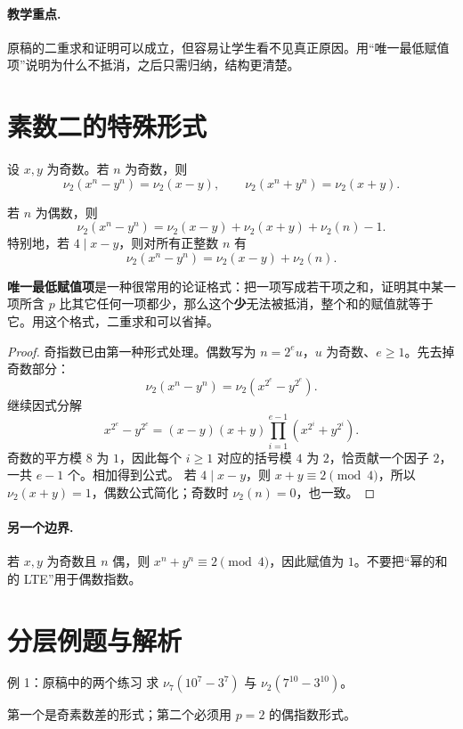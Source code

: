 \paragraph{教学重点.} 原稿的二重求和证明可以成立，但容易让学生看不见真正原因。用“唯一最低赋值项”说明为什么不抵消，之后只需归纳，结构更清楚。


\section{素数二的特殊形式}
\begin{theorem}[LTE，$p=2$]
设 $x,y$ 为奇数。若 $n$ 为奇数，则
\[
 \nu_2(x^n-y^n)=\nu_2(x-y),\qquad
 \nu_2(x^n+y^n)=\nu_2(x+y).
\]


若 $n$ 为偶数，则
\[
 \nu_2(x^n-y^n)=\nu_2(x-y)+\nu_2(x+y)+\nu_2(n)-1.
\]
特别地，若 $4\mid x-y$，则对所有正整数 $n$ 有
\[
 \nu_2(x^n-y^n)=\nu_2(x-y)+\nu_2(n).
\]
\end{theorem}

\begin{tip}[方法：唯一最低赋值项]
\textbf{唯一最低赋值项}是一种很常用的论证格式：把一项写成若干项之和，证明其中某一项所含 $p$ 比其它任何一项都少，那么这个\textbf{少}无法被抵消，整个和的赋值就等于它。用这个格式，二重求和可以省掉。
\end{tip}


\begin{proof}
奇指数已由第一种形式处理。偶数写为 $n=2^e u$，$u$ 为奇数、$e\ge1$。先去掉奇数部分：
\[
\nu_2(x^n-y^n)=\nu_2(x^{2^e}-y^{2^e}).
\]
继续因式分解
\[
 x^{2^e}-y^{2^e}=(x-y)(x+y)\prod_{i=1}^{e-1}(x^{2^i}+y^{2^i}).
\]
奇数的平方模 $8$ 为 $1$，因此每个 $i\ge1$ 对应的括号模 $4$ 为 $2$，恰贡献一个因子 $2$，一共 $e-1$ 个。相加得到公式。
若 $4\mid x-y$，则 $x+y\equiv2\pmod4$，所以 $\nu_2(x+y)=1$，偶数公式简化；奇数时 $\nu_2(n)=0$，也一致。
\end{proof}
\paragraph{另一个边界.} 若 $x,y$ 为奇数且 $n$ 偶，则 $x^n+y^n\equiv2\pmod4$，因此赋值为 $1$。不要把“幂的和的 LTE”用于偶数指数。


\section{分层例题与解析}
\begin{problem}{例 1：原稿中的两个练习}
求 $\nu_7(10^7-3^7)$ 与 $\nu_2(7^{10}-3^{10})$。
\end{problem}
\hint 第一个是奇素数差的形式；第二个必须用 $p=2$ 的偶指数形式。

